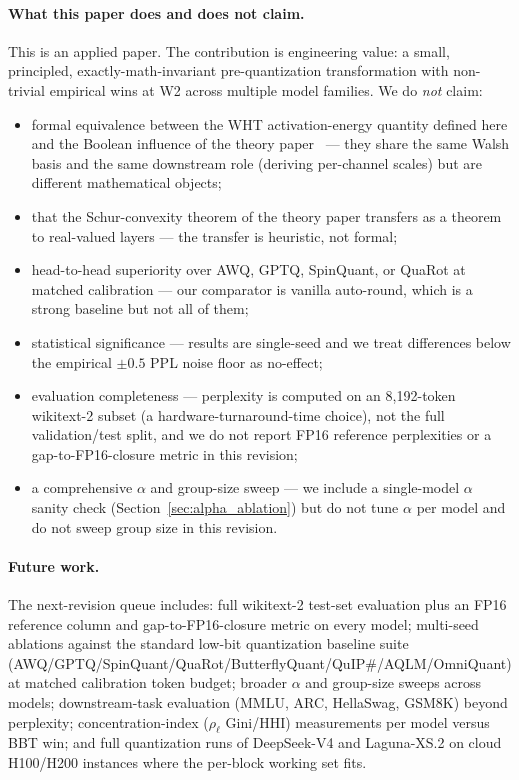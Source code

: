 \documentclass[11pt]{article}
\begin{document}
\paragraph{What this paper does and does not claim.}
This is an applied paper. The contribution is engineering value: a small, principled, exactly-math-invariant pre-quantization transformation with non-trivial empirical wins at W2 across multiple model families. We do \emph{not} claim:
\begin{itemize}
    \item formal equivalence between the WHT activation-energy quantity defined here and the Boolean influence of the theory paper~\cite{bbtTheoryCompanion} --- they share the same Walsh basis and the same downstream role (deriving per-channel scales) but are different mathematical objects;
    \item that the Schur-convexity theorem of the theory paper transfers as a theorem to real-valued layers --- the transfer is heuristic, not formal;
    \item head-to-head superiority over AWQ, GPTQ, SpinQuant, or QuaRot at matched calibration --- our comparator is vanilla auto-round, which is a strong baseline but not all of them;
    \item statistical significance --- results are single-seed and we treat differences below the empirical $\pm 0.5$ PPL noise floor as no-effect;
    \item evaluation completeness --- perplexity is computed on an 8{,}192-token wikitext-2 subset (a hardware-turnaround-time choice), not the full validation/test split, and we do not report FP16 reference perplexities or a gap-to-FP16-closure metric in this revision;
    \item a comprehensive $\alpha$ and group-size sweep --- we include a single-model $\alpha$ sanity check (Section~\ref{sec:alpha_ablation}) but do not tune $\alpha$ per model and do not sweep group size in this revision.
\end{itemize}

\paragraph{Future work.}
The next-revision queue includes: full wikitext-2 test-set evaluation plus an FP16 reference column and gap-to-FP16-closure metric on every model; multi-seed ablations against the standard low-bit quantization baseline suite (AWQ/GPTQ/SpinQuant/QuaRot/ButterflyQuant/QuIP\#/AQLM/OmniQuant) at matched calibration token budget; broader $\alpha$ and group-size sweeps across models; downstream-task evaluation (MMLU, ARC, HellaSwag, GSM8K) beyond perplexity; concentration-index ($\rho_\ell$ Gini/HHI) measurements per model versus BBT win; and full quantization runs of DeepSeek-V4 and Laguna-XS.2 on cloud H100/H200 instances where the per-block working set fits.
\end{document}

